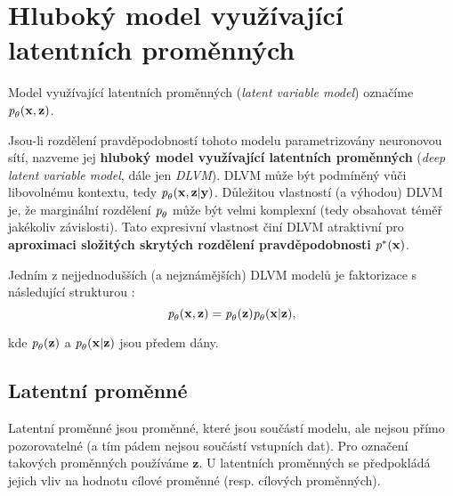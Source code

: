 \section{Hluboký model využívající latentních proměnných}
\label{sec:latent_variable_models}
Model využívající latentních proměnných (\emph{latent variable model}) označíme $\emph{p}_\theta(\mathbf{x}, \mathbf{z})$.

Jsou-li rozdělení pravděpodobností tohoto modelu parametrizovány neuronovou sítí,
nazveme jej \textbf{hluboký model využívající latentních proměnných} (\emph{deep latent variable model}, dále jen \emph{DLVM}). DLVM může být podmíněný vůči libovolnému kontextu, tedy $\emph{p}_{\theta}(\mathbf{x}, \mathbf{z}|\mathbf{y})$.
Důležitou vlastností (a výhodou) DLVM je, že marginální rozdělení $\emph{p}_\theta$ může být velmi komplexní (tedy obsahovat téměř jakékoliv závislosti).
Tato expresivní vlastnost činí DLVM atraktivní pro \textbf{aproximaci složitých skrytých rozdělení pravděpodobnosti} $\emph{p}^*(\mathbf{x})$. \cite{Kingma2019}

Jedním z nejjednodušších (a nejznámějších) DLVM modelů je faktorizace s následující strukturou \cite{Kingma2019}:
\begin{equation}
    \emph{p}_\theta(\mathbf{x}, \mathbf{z}) = \emph{p}_\theta(\mathbf{z})\emph{p}_\theta(\mathbf{x}\mid\mathbf{z}),
\end{equation}

kde $\emph{p}_\theta(\mathbf{z})$ a $\emph{p}_\theta(\mathbf{x}\mid\mathbf{z})$ jsou předem dány.
\subsection{Latentní proměnné}
Latentní proměnné jsou proměnné, které jsou součástí modelu, ale nejsou přímo pozorovatelné (a tím pádem nejsou součástí vstupních dat).
Pro označení takových proměnných používáme $\mathbf{z}$. U latentních proměnných se předpokládá jejich vliv na hodnotu cílové proměnné (resp. cílových proměnných). \cite{Kingma2019}
